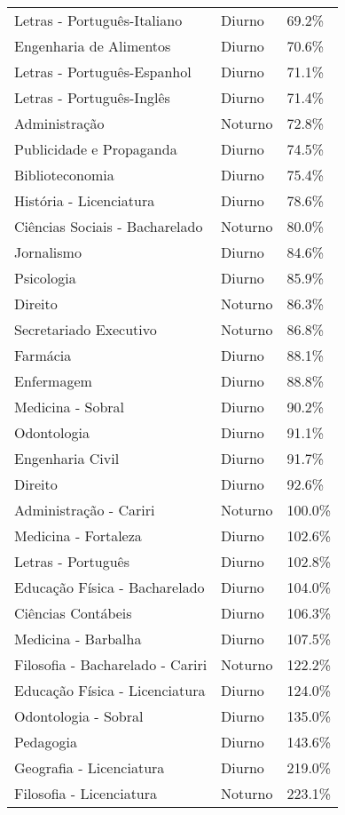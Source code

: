 \begin{tabular}{lll}
        Letras - Português-Italiano &   Diurno &   69.2\% \\
            Engenharia de Alimentos &   Diurno &   70.6\% \\
        Letras - Português-Espanhol &   Diurno &   71.1\% \\
          Letras - Português-Inglês &   Diurno &   71.4\% \\
                      Administração &  Noturno &   72.8\% \\
           Publicidade e Propaganda &   Diurno &   74.5\% \\
                    Biblioteconomia &   Diurno &   75.4\% \\
            História - Licenciatura &   Diurno &   78.6\% \\
     Ciências Sociais - Bacharelado &  Noturno &   80.0\% \\
                         Jornalismo &   Diurno &   84.6\% \\
                         Psicologia &   Diurno &   85.9\% \\
                            Direito &  Noturno &   86.3\% \\
             Secretariado Executivo &  Noturno &   86.8\% \\
                           Farmácia &   Diurno &   88.1\% \\
                         Enfermagem &   Diurno &   88.8\% \\
                  Medicina - Sobral &   Diurno &   90.2\% \\
                        Odontologia &   Diurno &   91.1\% \\
                   Engenharia Civil &   Diurno &   91.7\% \\
                            Direito &   Diurno &   92.6\% \\
             Administração - Cariri &  Noturno &  100.0\% \\
               Medicina - Fortaleza &   Diurno &  102.6\% \\
                 Letras - Português &   Diurno &  102.8\% \\
      Educação Física - Bacharelado &   Diurno &  104.0\% \\
                 Ciências Contábeis &   Diurno &  106.3\% \\
                Medicina - Barbalha &   Diurno &  107.5\% \\
   Filosofia - Bacharelado - Cariri &  Noturno &  122.2\% \\
     Educação Física - Licenciatura &   Diurno &  124.0\% \\
               Odontologia - Sobral &   Diurno &  135.0\% \\
                          Pedagogia &   Diurno &  143.6\% \\
           Geografia - Licenciatura &   Diurno &  219.0\% \\
           Filosofia - Licenciatura &  Noturno &  223.1\% \\
\bottomrule
\end{tabular}
